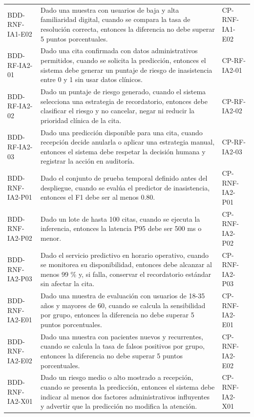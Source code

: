 \documentclass[11pt,a4paper]{article}
\begin{document}
\begin{appendices}
\begin{longtable}{p{2.8cm}p{10.6cm}p{2cm}}
		BDD-RNF-IA1-E02 & Dado una muestra con usuarios de baja y alta familiaridad digital, cuando se compara la tasa de resolución correcta, entonces la diferencia no debe superar 5 puntos porcentuales. & CP-RNF-IA1-E02\\
		BDD-RF-IA2-01 & Dado una cita confirmada con datos administrativos permitidos, cuando se solicita la predicción, entonces el sistema debe generar un puntaje de riesgo de inasistencia entre 0 y 1 sin usar datos clínicos. & CP-RF-IA2-01\\
		BDD-RF-IA2-02 & Dado un puntaje de riesgo generado, cuando el sistema selecciona una estrategia de recordatorio, entonces debe clasificar el riesgo y no cancelar, negar ni reducir la prioridad clínica de la cita. & CP-RF-IA2-02\\
		BDD-RF-IA2-03 & Dado una predicción disponible para una cita, cuando recepción decide anularla o aplicar una estrategia manual, entonces el sistema debe respetar la decisión humana y registrar la acción en auditoría. & CP-RF-IA2-03\\
		BDD-RNF-IA2-P01 & Dado el conjunto de prueba temporal definido antes del despliegue, cuando se evalúa el predictor de inasistencia, entonces el F1 debe ser al menos 0.80. & CP-RNF-IA2-P01\\
		BDD-RNF-IA2-P02 & Dado un lote de hasta 100 citas, cuando se ejecuta la inferencia, entonces la latencia P95 debe ser 500 ms o menor. & CP-RNF-IA2-P02\\
		BDD-RNF-IA2-P03 & Dado el servicio predictivo en horario operativo, cuando se monitorea su disponibilidad, entonces debe alcanzar al menos 99 \% y, si falla, conservar el recordatorio estándar sin afectar la cita. & CP-RNF-IA2-P03\\
		BDD-RNF-IA2-E01 & Dado una muestra de evaluación con usuarios de 18-35 años y mayores de 60, cuando se calcula la sensibilidad por grupo, entonces la diferencia no debe superar 5 puntos porcentuales. & CP-RNF-IA2-E01\\
		BDD-RNF-IA2-E02 & Dado una muestra con pacientes nuevos y recurrentes, cuando se calcula la tasa de falsos positivos por grupo, entonces la diferencia no debe superar 5 puntos porcentuales. & CP-RNF-IA2-E02\\
		BDD-RNF-IA2-X01 & Dado un riesgo medio o alto mostrado a recepción, cuando se presenta la predicción, entonces el sistema debe indicar al menos dos factores administrativos influyentes y advertir que la predicción no modifica la atención. & CP-RNF-IA2-X01\\
		\bottomrule\end{longtable}
	\normalsize
	

\end{appendices}
\end{document}
